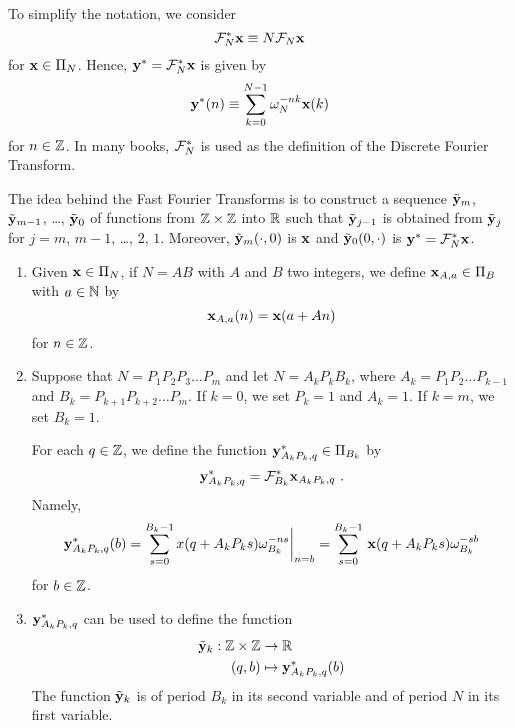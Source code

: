 To simplify the notation, we consider
\[
\mathcal{F}^\ast_N \mathbf{x} \equiv N \mathcal{F}_N \mathbf{x}
\]
for $\mathbf{x}\in \Pi_N$.  Hence,
$\mathbf{y}^\ast = \mathcal{F}^\ast_N \mathbf{x}$ is given by
\[
\mathbf{y}^\ast(n) \equiv \sum_{k=0}^{N-1} \omega_N^{-nk} \mathbf{x}(k)
\]
for $n \in \mathbb{Z}$.  In many books, $\mathcal{F}^\ast_N$ is used as the definition
of the Discrete Fourier Transform.

The idea behind the Fast Fourier Transforms is to construct a sequence
$\tilde{\mathbf{y}}_m$, $\tilde{\mathbf{y}}_{m-1}$, \ldots, $\tilde{\mathbf{y}}_0$ of functions from
$\mathbb{Z}\times \mathbb{Z}$ into $\mathbb{R}$ such that $\tilde{\mathbf{y}}_{j-1}$ is obtained from
$\tilde{\mathbf{y}}_j$ for $j=m$, $m-1$, \ldots , $2$, $1$.  Moreover,
$\tilde{\mathbf{y}}_m(\cdot,0)$ is $\mathbf{x}$ and $\tilde{\mathbf{y}}_0(0,\cdot)$ is
$\mathbf{y}^\ast = \mathcal{F}^\ast_N \mathbf{x}$.

\begin{defn}
\begin{enumerate}
\item Given $\mathbf{x} \in \Pi_N$, if $N=AB$ with $A$ and $B$ two
integers, we define $\mathbf{x}_{A,a} \in \Pi_B$ with $a\in \mathbb{N}$ by
\[
\mathbf{x}_{A,a}(n) = \mathbf{x}(a+An)
\]
for $n \in \mathbb{Z}$.
\item Suppose that $N = P_1 P_2 P_3 \ldots P_m$ and let
$N = A_k  P_k B_k$, where $A_k=P_1 P_2 \ldots P_{k-1}$ and
$B_k=P_{k+1} P_{k+2} \ldots P_m$.  If $k=0$, we set $P_k = 1$ and
$A_k = 1$.  If $k=m$, we set $B_k=1$. 

For each $q \in \mathbb{Z}$, we define the function
$\mathbf{y}^\ast_{A_k P_k,q} \in \Pi_{B_k}$ by
\[
\mathbf{y}^\ast_{A_k P_k,q} = \mathcal{F}^\ast_{B_k} \mathbf{x}_{A_k P_k,q} \ .
\]
Namely,
\begin{equation} \label{FFTstep}
\mathbf{y}^\ast_{A_k P_k,q}(b) =
\sum_{s=0}^{B_k-1} x(q +A_kP_k s) \omega_{B_k}^{-ns} \bigg|_{n=b}
= \sum_{s=0}^{B_k-1}\, \mathbf{x}(q+A_k P_k s) \omega_{B_k}^{-s b}
\end{equation}
for $b \in \mathbb{Z}$.
\item $\mathbf{y}^\ast_{A_k P_k, q}$ can be used to define the function
\begin{align*}
\tilde{\mathbf{y}}_k: \mathbb{Z} \times \mathbb{Z} & \rightarrow \mathbb{R} \\
(q,b) &\mapsto \mathbf{y}^\ast_{A_k P_k,q}(b)
\end{align*}
The function $\tilde{\mathbf{y}}_k$ is of period $B_k$ in its second variable
and of period $N$ in its first variable.
\end{enumerate}
\end{defn}

